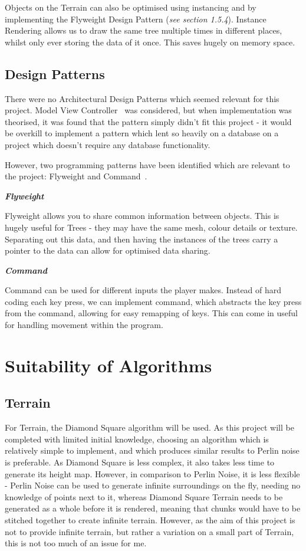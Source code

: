 \documentclass[a4paper,10pt]{report}
\begin{document}
Objects on the Terrain can also be optimised using instancing and by implementing the Flyweight Design Pattern (\emph{see section 1.5.4}). Instance Rendering allows us to draw the same tree multiple times in different places, whilst only ever storing the data of it once. This saves hugely on memory space.  


\subsection{Design Patterns}

There were no Architectural Design Patterns which seemed relevant for this project. Model View Controller~\cite{vlissides1995design} was considered, but when implementation was theorised, it was found that the pattern simply didn't fit this project - it would be overkill to implement a pattern which lent so heavily on a database on a project which doesn't require any database functionality. \medskip

However, two programming patterns have been identified which are relevant to the project: Flyweight and Command~\cite{nystrom2014game}.\medskip

\emph{\textbf{Flyweight}}\medskip

Flyweight allows you to share common information between objects. This is hugely useful for Trees - they may have the same mesh, colour details or texture. Separating out this data, and then having the instances of the trees carry a pointer to the data can allow for optimised data sharing. \medskip

\emph{\textbf{Command}}\medskip

Command can be used for different inputs the player makes. Instead of hard coding each key press, we can implement command, which abstracts the key press from the command, allowing for easy remapping of keys. This can come in useful for handling movement within the program. 

\section{Suitability of Algorithms}

\subsection{Terrain}

For Terrain, the Diamond Square algorithm will be used. As this project will be completed with limited initial knowledge, choosing an algorithm which is relatively simple to implement, and which produces similar results to Perlin noise is preferable. As Diamond Square is less complex, it also takes less time to generate its height map. However, in comparison to Perlin Noise, it is less flexible - Perlin Noise can be used to generate infinite surroundings on the fly, needing no knowledge of points next to it, whereas Diamond Square Terrain needs to be generated as a whole before it is rendered, meaning that chunks would have to be stitched together to create infinite terrain. However, as the aim of this project is not to provide infinite terrain, but rather a variation on a small part of Terrain, this is not too much of an issue for me. 
\end{document}
